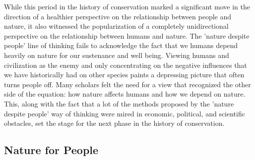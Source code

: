 \documentclass[rutwik_proposal.tex]{subfiles}
\begin{document}
While this period in the history of conservation marked a significant move in the direction of a healthier perspective on the relationship between people and nature, it also witnessed the popularization of a completely unidirectional perspective on the relationship between humans and nature. The 'nature despite people' line of thinking fails to acknowledge the fact that we humans depend heavily on nature for our sustenance and well being. Viewing humans and civilization as the enemy and only concentrating on the negative influences that we have historically had on other species paints a depressing picture that often turns people off. Many scholars felt the need for a view that recognized the other side of the equation: how nature affects humans and how we depend on nature. This, along with the fact that a lot of the methods proposed by the 'nature despite people' way of thinking were mired in economic, political, and scientific obstacles, set the stage for the next phase in the history of conservation.

\subsection{Nature for People}\label{ecoservices}
\end{document}
